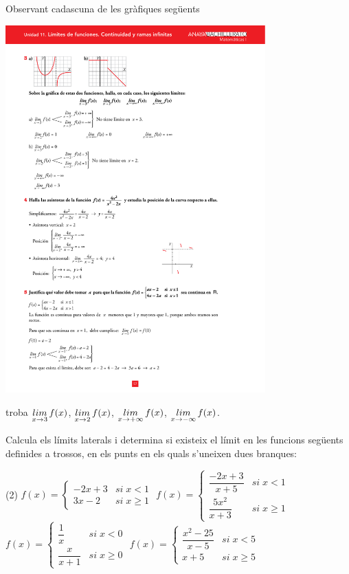 \begin{mylist}
\exer Observant cadascuna de les gràfiques següents
\begin{center}
	\includegraphics[width=10cm]{img-06/limits1.pdf}
\end{center}
troba $\mathop{lim}\limits_{x\to 3} f(x)$, $\mathop{lim}\limits_{x\to 2} f(x)$, $\mathop{lim}\limits_{x\to +\infty} f(x)$, $\mathop{lim}\limits_{x\to -\infty} f(x)$.

\answers[cols=1]{[
	 $\limx{3} f(x)=\nexists$; $\limx{2} f(x)=1$; $\limx{+\infty} f(x)=0^-$; $\limx{-\infty} f(x)=+\infty$,
	 $\limx{3} f(x)=0$; $\limx{2} f(x)=\nexists$; $\limx{+\infty} f(x)=-\infty$; $\limx{-\infty} f(x)=3$
	]}


\exer  Calcula els límits laterals i determina si existeix el límit en les funcions següents definides a trossos, en els punts en els quals s'uneixen dues branques:


\begin{tasks}(2) 	
	\task $f(x)=\left\{\begin{array}{cc} {-2x+3} & {si\; x<1} \\ {3x-2} & {si\; x\ge 1} \end{array}\right. $   
	\task $f(x)=\left\{\begin{array}{cc} {\dfrac{-2x+3}{x+5} } & {si\; x<1} \\ [0.4cm] {\dfrac{5x^{2} }{x+3} } & {si\; x\ge 1} \end{array}\right. $  
	\task $f(x)=\left\{\begin{array}{cc} {\dfrac{1}{x} } & {si\; x<0} \\ [0.4cm] {\dfrac{x}{x+1 } } & {si\; x\ge 0} \end{array}\right. $ 
	\task $f(x)=\left\{\begin{array}{cc} {\dfrac{x^2-25}{x-5} } & {si\; x<5} \\ [0.4cm] {x+5 } & {si\; x\ge 5} \end{array}\right. $ 
\end{tasks}


\end{mylist}
